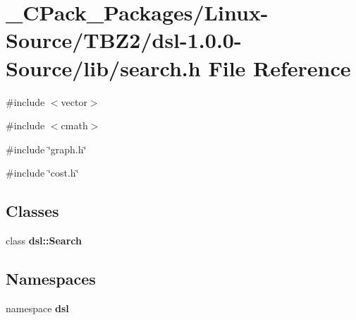 \section{\_\-CPack\_\-Packages/Linux-\/Source/TBZ2/dsl-\/1.0.0-\/Source/lib/search.h File Reference}
\label{__CPack__Packages_2Linux-Source_2TBZ2_2dsl-1_80_80-Source_2lib_2search_8h}
{\ttfamily \#include $<$vector$>$}\par
{\ttfamily \#include $<$cmath$>$}\par
{\ttfamily \#include \char`\"{}graph.h\char`\"{}}\par
{\ttfamily \#include \char`\"{}cost.h\char`\"{}}\par
\subsection*{Classes}
\begin{DoxyCompactItemize}
\item 
class {\bf dsl::Search}
\end{DoxyCompactItemize}
\subsection*{Namespaces}
\begin{DoxyCompactItemize}
\item 
namespace {\bf dsl}
\end{DoxyCompactItemize}
